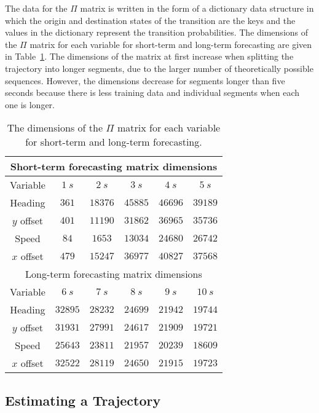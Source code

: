 \documentclass[preprint,12pt]{elsarticle}
\begin{document}
The data for the $\Pi$ matrix is written in the form of a dictionary data structure in which the origin and destination states of the transition are the keys and the values in the dictionary represent the transition probabilities. The dimensions of the $\Pi$ matrix for each variable for short-term and long-term forecasting are given in Table~\ref{tab:dimmatr}. The dimensions of the matrix at first increase when splitting the trajectory into longer segments, due to the larger number of theoretically possible sequences. However, the dimensions decrease for segments longer than five seconds because there is less training data and individual segments when each one is longer.
 
\begin{table}[!ht]
	\centering
	\begin{tabular}{|c|c|c|c|c|c|}
		\hline
		\multicolumn{6}{|c|}{Short-term forecasting matrix dimensions} \\ \hline
		Variable & $1 \ s$ & $2 \ s$ & $3 \ s$ & $4 \ s$ & $5 \ s$ \\ \hline
        Heading & $361$ & $18376$ & $45885$ & $46696$ & $39189$ \\ \hline
        $y$ offset & $401$ & $11190$ & $31862$ & $36965$ & $35736$ \\ \hline
        Speed & $84$ & $1653$ & $13034$ & $24680$ & $26742$ \\ \hline
        $x$ offset & $479$ & $15247$ & $36977$ & $40827$ & $37568$ \\ \hline
		\multicolumn{6}{|c|}{Long-term forecasting matrix dimensions} \\ \hline
		Variable & $6 \ s$ & $7 \ s$ & $8 \ s$ & $9 \ s$ & $10 \ s$ \\ \hline
        Heading & $32895$ & $28232$ & $24699$ & $21942$ & $19744$ \\ \hline
        $y$ offset & $31931$ & $27991$ & $24617$ & $21909$ & $19721$ \\ \hline
        Speed & $25643$ & $23811$ & $21957$ & $20239$ & $18609$ \\ \hline
        $x$ offset & $32522$ & $28119$ & $24650$ & $21915$ & $19723$ \\ \hline
	\end{tabular}
	\caption{The dimensions of the $\Pi$ matrix for each variable for short-term and long-term forecasting.}
	\label{tab:dimmatr}
\end{table}
  
\subsection{Estimating a Trajectory}
\end{document}
